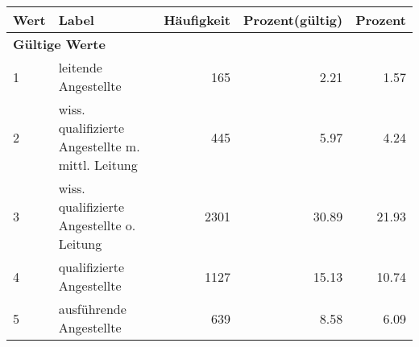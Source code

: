      \begin{longtable}{lXrrr}
     \toprule
     \textbf{Wert} & \textbf{Label} & \textbf{Häufigkeit} & \textbf{Prozent(gültig)} & \textbf{Prozent} \\
     \endhead
     \midrule
     \multicolumn{5}{l}{\textbf{Gültige Werte}}\\

     1 &
     \multicolumn{1}{X}{ leitende Angestellte   } &


       \num{165} &
       \num[round-mode=places,round-precision=2]{2.21} &
         \num[round-mode=places,round-precision=2]{1.57} \\

     2 &
     \multicolumn{1}{X}{ wiss. qualifizierte Angestellte m. mittl. Leitung   } &


       \num{445} &
       \num[round-mode=places,round-precision=2]{5.97} &
         \num[round-mode=places,round-precision=2]{4.24} \\

     3 &
     \multicolumn{1}{X}{ wiss. qualifizierte Angestellte o. Leitung   } &


       \num{2301} &
       \num[round-mode=places,round-precision=2]{30.89} &
         \num[round-mode=places,round-precision=2]{21.93} \\

     4 &
     \multicolumn{1}{X}{ qualifizierte Angestellte   } &


       \num{1127} &
       \num[round-mode=places,round-precision=2]{15.13} &
         \num[round-mode=places,round-precision=2]{10.74} \\

     5 &
     \multicolumn{1}{X}{ ausführende Angestellte   } &


       \num{639} &
       \num[round-mode=places,round-precision=2]{8.58} &
         \num[round-mode=places,round-precision=2]{6.09} \\


\end{longtable}
